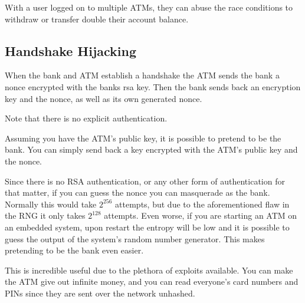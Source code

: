 \documentclass{article}
\begin{document}
With a user logged on to multiple ATMs, they can abuse the race conditions to withdraw or transfer double their account balance.

\subsection{Handshake Hijacking}

When the bank and ATM establish a handshake the ATM sends the bank a 
nonce encrypted with the banks rsa key. Then the bank sends back an
encryption key and the nonce, as well as its own generated nonce.

Note that there is no explicit authentication.

Assuming you have the ATM's public key, it is possible to pretend to be the bank. You can simply send back a key encrypted with the ATM's public key and the nonce.

Since there is no RSA authentication, or any other form of authentication for that matter,
if you can guess the nonce you can masquerade as the bank. Normally this would
take $2^{256}$ attempts, but due to the aforementioned flaw in the RNG it only
takes $2^{128}$ attempts. Even worse, if you are starting an ATM on an embedded
system, upon restart the entropy will be low and it is possible to guess
the output of the system's random number generator. This makes pretending to be the bank even easier.

This is incredible useful due to the plethora of exploits available. You can 
make the ATM give out infinite money, and you can read everyone's card numbers 
and PINs since they are sent over the network unhashed.
\end{document}
